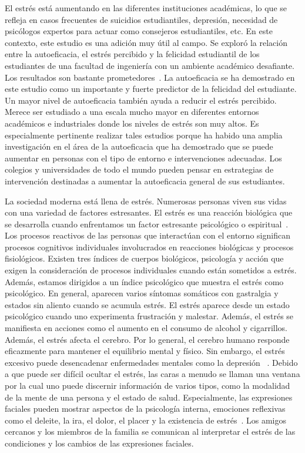 \documentclass[jou,apacite]{apa6}
\begin{document}
El estrés está aumentando en las diferentes instituciones académicas, lo que se refleja en casos frecuentes de suicidios estudiantiles, depresión, necesidad de psicólogos expertos para actuar como consejeros estudiantiles, etc. En este contexto, este estudio es una adición muy útil al campo. Se exploró la relación entre la autoeficacia, el estrés percibido y la felicidad estudiantil de los estudiantes de una facultad de ingeniería con un ambiente académico desafiante. Los resultados son bastante prometedores~\cite{Shilpa}. La autoeficacia se ha demostrado en este estudio como un importante y fuerte predictor de la felicidad del estudiante. Un mayor nivel de autoeficacia también ayuda a reducir el estrés percibido. Merece ser estudiado a una escala mucho mayor en diferentes entornos académicos e industriales donde los niveles de estrés son muy altos. Es especialmente pertinente realizar tales estudios porque ha habido una amplia investigación en el área de la autoeficacia que ha demostrado que se puede aumentar en personas con el tipo de entorno e intervenciones adecuadas. Los colegios y universidades de todo el mundo pueden pensar en estrategias de intervención destinadas a aumentar la autoeficacia general de sus estudiantes.

La sociedad moderna está llena de estrés. Numerosas personas viven sus vidas con una variedad de factores estresantes. El estrés es una reacción biológica que se desarrolla cuando enfrentamos un factor estresante psicológico o espiritual~\cite{Yata}. Los procesos reactivos de las personas que interactúan con el entorno significan procesos cognitivos individuales involucrados en reacciones biológicas y procesos fisiológicos. Existen tres índices de cuerpos biológicos, psicología y acción que exigen la consideración de procesos individuales cuando están sometidos a estrés. Además, estamos dirigidos a un índice psicológico que muestra el estrés como psicológico. En general, aparecen varios síntomas somáticos con gastralgia y estados sin aliento cuando se acumula estrés. El estrés aparece desde un estado psicológico cuando uno experimenta frustración y malestar. Además, el estrés se manifiesta en acciones como el aumento en el consumo de alcohol y cigarrillos. Además, el estrés afecta el cerebro. Por lo general, el cerebro humano responde eficazmente para mantener el equilibrio mental y físico. Sin embargo, el estrés excesivo puede desencadenar enfermedades mentales como la depresión ~\cite{catherine}. Debido a que puede ser difícil ocultar el estrés, las caras a menudo se llaman una ventana por la cual uno puede discernir información de varios tipos, como la modalidad de la mente de una persona y el estado de salud. Especialmente, las expresiones faciales pueden mostrar aspectos de la psicología interna, emociones reflexivas como el deleite, la ira, el dolor, el placer y la existencia de estrés~\cite{Sato}. Los amigos cercanos y los miembros de la familia se comunican al interpretar el estrés de las condiciones y los cambios de las expresiones faciales.
\end{document}
